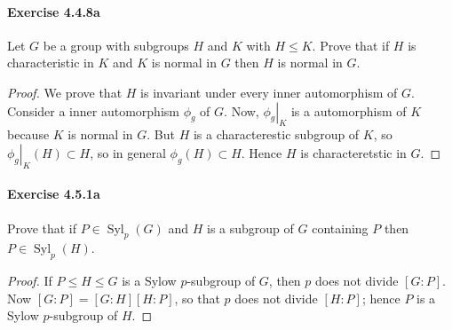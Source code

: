 \documentclass{article}
\theoremstyle{definition}
\begin{document}
\paragraph{Exercise 4.4.8a} Let $G$ be a group with subgroups $H$ and $K$ with $H \leq K$. Prove that if $H$ is characteristic in $K$ and $K$ is normal in $G$ then $H$ is normal in $G$.
\begin{proof}
We prove that $H$ is invariant under every inner automorphism of $G$. Consider a inner automorphism $\phi_g$ of $G$. Now, $\left.\phi_g\right|_K$ is a automorphism of $K$ because $K$ is normal in $G$. But $H$ is a characterestic subgroup of $K$, so $\left.\phi_g\right|_K(H) \subset H$, so in general $\phi_g(H) \subset H$. Hence $H$ is characteretstic in $G$.
\end{proof}



\paragraph{Exercise 4.5.1a} Prove that if $P \in \operatorname{Syl}_{p}(G)$ and $H$ is a subgroup of $G$ containing $P$ then $P \in \operatorname{Syl}_{p}(H)$.
\begin{proof}
If $P \leq H \leq G$ is a Sylow $p$-subgroup of $G$, then $p$ does not divide $[G: P]$. Now $[G: P]=[G: H][H: P]$, so that $p$ does not divide $[H: P]$; hence $P$ is a Sylow $p$-subgroup of $H$.
\end{proof}
\end{document}
